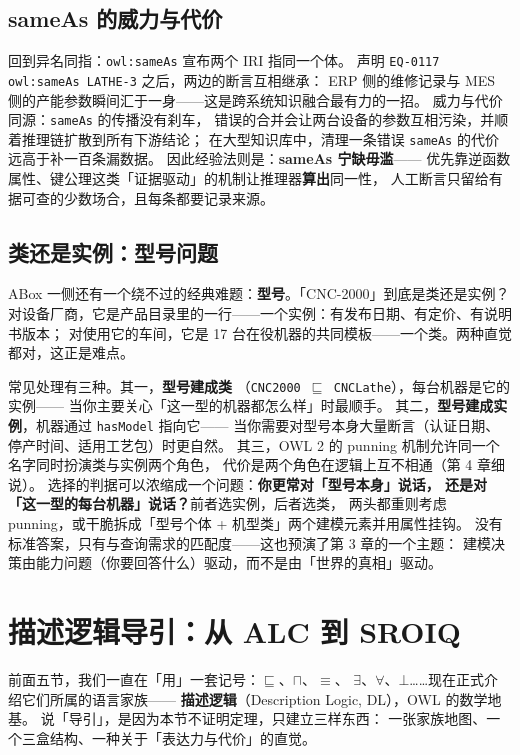 \subsection{sameAs 的威力与代价}

回到异名同指：\texttt{owl:sameAs} 宣布两个 IRI 指同一个体。
声明 \texttt{EQ-0117 owl:sameAs LATHE-3} 之后，两边的断言互相继承：
ERP 侧的维修记录与 MES 侧的产能参数瞬间汇于一身——这是跨系统知识融合最有力的一招。
威力与代价同源：\texttt{sameAs} 的传播没有刹车，
错误的合并会让两台设备的参数互相污染，并顺着推理链扩散到所有下游结论；
在大型知识库中，清理一条错误 \texttt{sameAs} 的代价远高于补一百条漏数据。
因此经验法则是：\textbf{sameAs 宁缺毋滥}——
优先靠逆函数属性、键公理这类「证据驱动」的机制让推理器\textbf{算出}同一性，
人工断言只留给有据可查的少数场合，且每条都要记录来源。

\subsection{类还是实例：型号问题}

ABox 一侧还有一个绕不过的经典难题：\textbf{型号}。「CNC-2000」到底是类还是实例？
对设备厂商，它是产品目录里的一行——一个实例：有发布日期、有定价、有说明书版本；
对使用它的车间，它是 17 台在役机器的共同模板——一个类。两种直觉都对，这正是难点。

常见处理有三种。其一，\textbf{型号建成类}
（\texttt{CNC2000 \(\sqsubseteq\) CNCLathe}），每台机器是它的实例——
当你主要关心「这一型的机器都怎么样」时最顺手。
其二，\textbf{型号建成实例}，机器通过 \texttt{hasModel} 指向它——
当你需要对型号本身大量断言（认证日期、停产时间、适用工艺包）时更自然。
其三，OWL 2 的 punning 机制允许同一个名字同时扮演类与实例两个角色，
代价是两个角色在逻辑上互不相通（第 4 章细说）。
选择的判据可以浓缩成一个问题：\textbf{你更常对「型号本身」说话，
还是对「这一型的每台机器」说话？}前者选实例，后者选类，
两头都重则考虑 punning，或干脆拆成「型号个体 + 机型类」两个建模元素并用属性挂钩。
没有标准答案，只有与查询需求的匹配度——这也预演了第 3 章的一个主题：
建模决策由能力问题（你要回答什么）驱动，而不是由「世界的真相」驱动。

\section{描述逻辑导引：从 ALC 到 SROIQ}

前面五节，我们一直在「用」一套记号：\(\sqsubseteq\)、\(\sqcap\)、\(\equiv\)、
\(\exists\)、\(\forall\)、\(\bot\)……现在正式介绍它们所属的语言家族——
\textbf{描述逻辑}（Description Logic, DL），OWL 的数学地基。
说「导引」，是因为本节不证明定理，只建立三样东西：
一张家族地图、一个三盒结构、一种关于「表达力与代价」的直觉。

